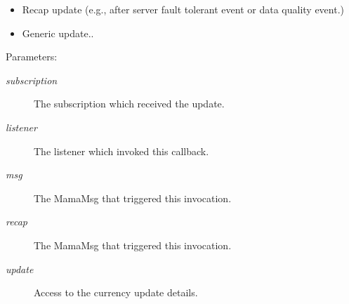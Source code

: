 \begin{itemize}
\item Recap update (e.g., after server fault tolerant event or data quality event.)\item Generic update..\end{itemize}


\begin{Desc}
\item[Parameters:]
\begin{description}
\item[{\em subscription}]The subscription which received the update. \item[{\em listener}]The listener which invoked this callback. \item[{\em msg}]The Mama\-Msg that triggered this invocation. \item[{\em recap}]The Mama\-Msg that triggered this invocation. \item[{\em update}]Access to the currency update details. \end{description}
\end{Desc}
